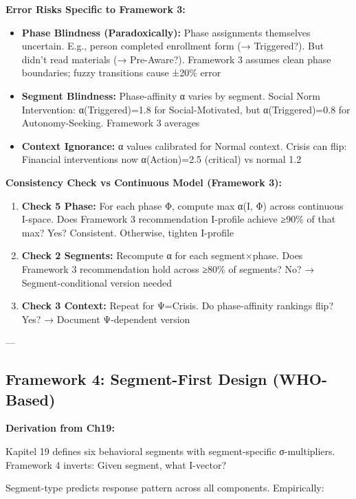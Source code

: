 \textbf{Error Risks Specific to Framework 3:}
\begin{itemize}[nosep]
\item \textbf{Phase Blindness (Paradoxically):} Phase assignments themselves uncertain. E.g., person completed enrollment form (→ Triggered?). But didn't read materials (→ Pre-Aware?). Framework 3 assumes clean phase boundaries; fuzzy transitions cause ±20\% error
\item \textbf{Segment Blindness:} Phase-affinity α varies by segment. Social Norm Intervention: α(Triggered)=1.8 for Social-Motivated, but α(Triggered)=0.8 for Autonomy-Seeking. Framework 3 averages
\item \textbf{Context Ignorance:} α values calibrated for Normal context. Crisis can flip: Financial interventions now α(Action)=2.5 (critical) vs normal 1.2
\end{itemize}

\textbf{Consistency Check vs Continuous Model (Framework 3):}
\begin{enumerate}[nosep]
\item \textbf{Check 5 Phase:} For each phase Φ, compute max α(I, Φ) across continuous I-space. Does Framework 3 recommendation I-profile achieve ≥90\% of that max? Yes? Consistent. Otherwise, tighten I-profile
\item \textbf{Check 2 Segments:} Recompute α for each segment×phase. Does Framework 3 recommendation hold across ≥80\% of segments? No? → Segment-conditional version needed
\item \textbf{Check 3 Context:} Repeat for Ψ=Crisis. Do phase-affinity rankings flip? Yes? → Document Ψ-dependent version
\end{enumerate}

---

\subsection{Framework 4: Segment-First Design (WHO-Based)}
\label{subsec:20-framework-4}

\textbf{Derivation from Ch19:}

Kapitel 19 defines six behavioral segments with segment-specific σ-multipliers. Framework 4 inverts: Given segment, what I-vector?

Segment-type predicts response pattern across all components. Empirically:

